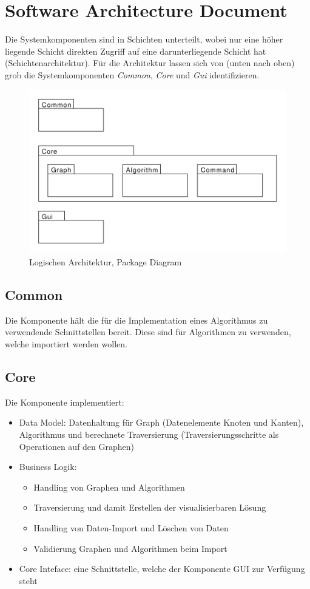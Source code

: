 \section{Software Architecture Document}
\label{sec:Software Architecture Document}
Die Systemkomponenten sind in Schichten unterteilt, wobei nur eine h\"oher liegende Schicht direkten Zugriff auf eine darunterliegende Schicht hat (Schichtenarchitektur). F\"ur die Architektur lassen sich von (unten nach oben) grob die Systemkomponenten \textit{Common}, \textit{Core} und \textit{Gui} identifizieren.
% 
\begin{figure}[H]
    \centering
    \includegraphics[scale=0.5]{diagrams/package-diagram.pdf}
    \caption{Logischen Architektur, Package Diagram}
    \label{fig:package-diagram}
\end{figure}
% 
\subsection{Common}
\label{subsec:Common}
Die Komponente h\"alt die f\"ur die Implementation eines Algorithmus zu verwendende Schnittstellen bereit. Diese sind f\"ur Algorithmen zu verwenden, welche importiert werden wollen.
% 
\subsection{Core}
\label{subsec:Core}
Die Komponente implementiert:
\begin{itemize}
  \item Data Model: Datenhaltung f\"ur Graph (Datenelemente Knoten und Kanten), Algorithmus und berechnete Traversierung (Traversierungsschritte als Operationen auf den Graphen)
  \item Business Logik: 
  \begin{itemize}
      \item Handling von Graphen und Algorithmen
      \item Traversierung und damit Erstellen der visualisierbaren L\"osung
      \item Handling von Daten-Import und L\"oschen von Daten
      \item Validierung Graphen und Algorithmen beim Import
  \end{itemize}
  \item Core Inteface: eine Schnittstelle, welche der Komponente GUI zur Verf\"ugung steht
\end{itemize}
% 
